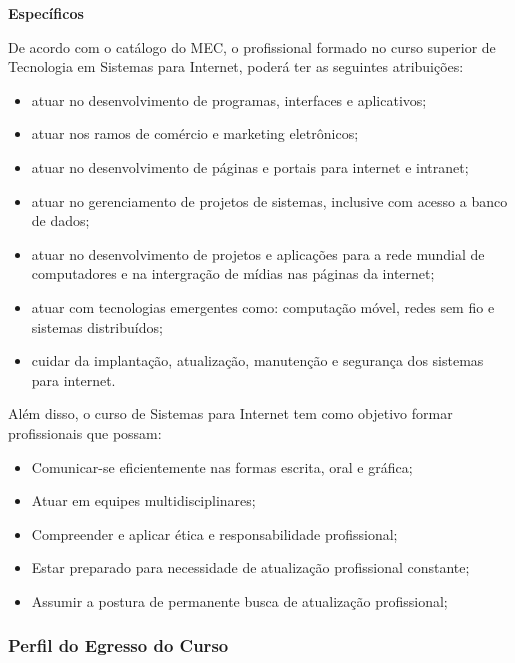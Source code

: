 \vspace{5mm}
\textbf{Específicos}

\vspace{5mm}

De acordo com o cat\'alogo do MEC, o profissional formado no curso superior de Tecnologia em Sistemas para Internet, poder\'a ter as seguintes atribui\c{c}\~oes:

\begin{itemize}

\item atuar no desenvolvimento de programas, interfaces e aplicativos;
\item atuar nos ramos de com\'ercio e marketing eletr\^onicos;
\item atuar no desenvolvimento de p\'aginas e portais para internet e intranet;
\item atuar no gerenciamento de projetos de sistemas, inclusive com acesso a banco de dados;
\item atuar no desenvolvimento de projetos e aplica\c{c}\~oes para a rede mundial de computadores e na intergra\c{c}\~ao de m\'idias nas p\'aginas da internet;
\item atuar com tecnologias emergentes como: computa\c{c}\~ao m\'ovel, redes sem fio e sistemas distribu\'idos;
\item cuidar da implanta\c{c}\~ao, atualiza\c{c}\~ao, manuten\c{c}\~ao e seguran\c{c}a dos sistemas para internet.
\end{itemize}

Al\'em disso, o curso de Sistemas para Internet tem como objetivo formar profissionais que possam:

\begin{itemize}
\item Comunicar-se eficientemente nas formas escrita, oral e gráfica;
\item Atuar em equipes multidisciplinares;
\item Compreender e aplicar ética e responsabilidade profissional;
\item Estar preparado para necessidade de atualização profissional constante;
\item Assumir a postura de permanente busca de atualização profissional;
\end{itemize}

\subsubsection{Perfil do Egresso do Curso}

